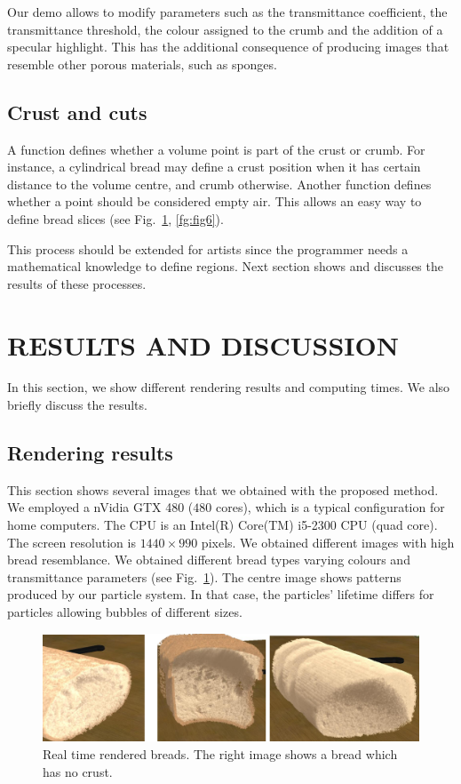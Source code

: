 \documentclass[oneside,a4paper,english,links]{amca}
\begin{document}
Our demo allows to modify parameters such as the
transmittance coefficient, the transmittance threshold,
the colour assigned to the crumb and the addition of a specular
highlight. This has the additional consequence of
producing images that resemble other porous materials,
such as sponges.

\subsection{Crust and cuts}
A function defines whether a volume point is part of the crust
or crumb. For instance, a cylindrical bread may define
a crust position when it has certain distance to the volume centre, and crumb otherwise. Another function defines whether a point should be
considered empty air. This allows an easy way to define bread slices (see Fig.~\ref{fg:fig5}, \ref{fg:fig6}).

This process should be extended for artists since the programmer needs a mathematical knowledge to define regions. Next section shows and discusses the results of these processes.

\section{RESULTS AND DISCUSSION}

In this section, we show different rendering results and computing times. We also briefly discuss the results.

\subsection{Rendering results}

This section shows several images that we obtained with the proposed
method. We employed a nVidia GTX 480 ($480$ cores), which
is a typical configuration for home computers. The CPU is an Intel(R)
Core(TM) i5-2300 CPU (quad core). The screen resolution is
$1440\times990$ pixels. We obtained different images with high bread resemblance. We obtained different bread types varying colours
and transmittance parameters (see Fig.~\ref{fg:fig5}). The centre image shows patterns produced by our particle system. In that case, the particles' lifetime differs for particles allowing bubbles of different sizes.

\begin{figure}[htb!]
  \centerline{\includegraphics[scale=0.3]{fig5}}
  \caption{Real time rendered breads. The right image shows a bread which has no crust. }
  \label{fg:fig5}
\end{figure}
\end{document}
